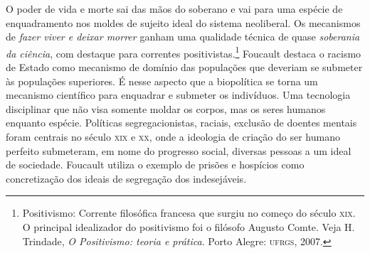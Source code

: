 O poder de vida e morte sai das mãos do soberano e vai para uma espécie
de enquadramento nos moldes de sujeito ideal do sistema neoliberal. Os
mecanismos de \textit{fazer viver e deixar morrer} ganham uma qualidade
técnica de quase \textit{soberania da ciência}, com destaque para correntes
positivistas.\footnote{Positivismo: Corrente filosófica francesa que
  surgiu no começo do século \textsc{xix}. O principal idealizador do positivismo
  foi o filósofo Augusto Comte. Veja H. Trindade, \textit{O Positivismo: teoria e prática}. Porto Alegre: \textsc{ufrgs}, 2007.} Foucault destaca o
racismo de Estado como mecanismo de domínio das populações que deveriam
se submeter às populações superiores. É nesse aspecto que a biopolítica
se torna um mecanismo científico para enquadrar e submeter os
indivíduos. Uma tecnologia disciplinar que não visa somente moldar os
corpos, mas os seres humanos enquanto espécie. Políticas
segregacionistas, raciais, exclusão de doentes mentais foram centrais no
século \textsc{xix} e \textsc{xx}, onde a ideologia de criação do ser humano perfeito
submeteram, em nome do progresso social, diversas pessoas a um
ideal de sociedade. Foucault utiliza o exemplo de prisões e hospícios
como concretização dos ideais de segregação dos indesejáveis.

